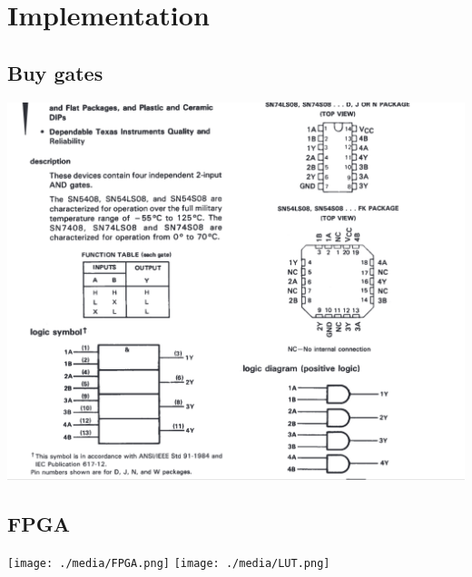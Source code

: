 \chapter{Implementation}
\section{Buy gates}
\includegraphics[width=0.7\linewidth]{media/sn74ls08.png}
\section{FPGA~\cite[Section~B.6.5]{stephen2022fundamentals}}
\texttt{[image: ./media/FPGA.png]}
\texttt{[image: ./media/LUT.png]}
